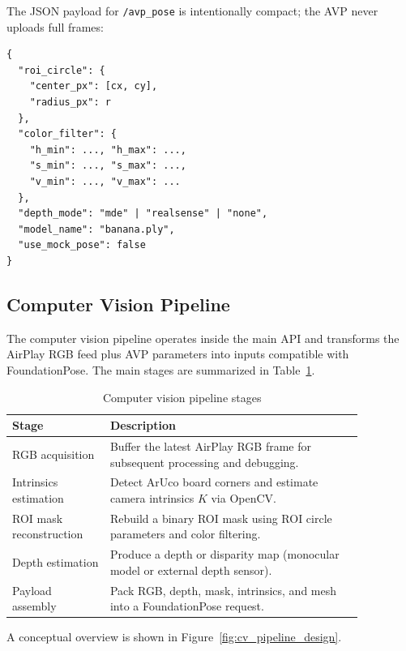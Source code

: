 The JSON payload for \texttt{/avp\_pose} is intentionally compact; the AVP never uploads full frames:

\begin{verbatim}
{
  "roi_circle": {
    "center_px": [cx, cy],
    "radius_px": r
  },
  "color_filter": {
    "h_min": ..., "h_max": ...,
    "s_min": ..., "s_max": ...,
    "v_min": ..., "v_max": ...
  },
  "depth_mode": "mde" | "realsense" | "none",
  "model_name": "banana.ply",
  "use_mock_pose": false
}
\end{verbatim}

\subsection{Computer Vision Pipeline}
\label{subsec:cv-pipeline-design}

The computer vision pipeline operates inside the main API and transforms the AirPlay RGB feed plus AVP parameters into inputs compatible with FoundationPose. The main stages are summarized in Table~\ref{tab:cv-stages}.

\begin{table}[H]
    \centering
    \caption{Computer vision pipeline stages}
    \label{tab:cv-stages}
    \begin{tabular}{p{0.24\linewidth}p{0.62\linewidth}}
        \toprule
        \textbf{Stage} & \textbf{Description} \\
        \midrule
        RGB acquisition &
        Buffer the latest AirPlay RGB frame for subsequent processing and debugging. \\
        Intrinsics estimation &
        Detect ArUco board corners and estimate camera intrinsics $K$ via OpenCV. \\
        ROI mask reconstruction &
        Rebuild a binary ROI mask using ROI circle parameters and color filtering. \\
        Depth estimation &
        Produce a depth or disparity map (monocular model or external depth sensor). \\
        Payload assembly &
        Pack RGB, depth, mask, intrinsics, and mesh into a FoundationPose request. \\
        \bottomrule
    \end{tabular}
\end{table}

A conceptual overview is shown in Figure~\ref{fig:cv_pipeline_design}.

